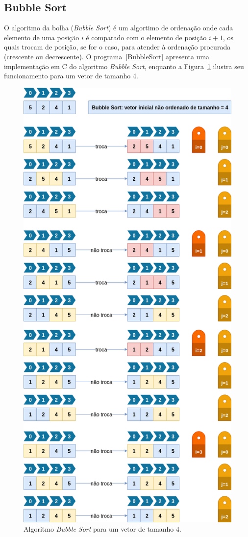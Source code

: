 \documentclass[11pt,fleqn]{book} %
\begin{document}
\subsection*{Bubble Sort}
O algoritmo da bolha (\textit{Bubble Sort}) é um algortimo de ordenação onde cada elemento de uma posição $i$ é comparado com o elemento de posição $i+1$, os quais trocam de posição, se for o caso, para atender à ordenação procurada (crescente ou decrescente).
O  programa~\ref{BubbleSort} apresenta uma implementação em C do algoritmo \textit{Bubble Sort}, enquanto a Figura~\ref{diaBubleSort} ilustra seu funcionamento para um vetor de tamanho 4.
\label{BubbleSort}
\begin{figure}
	\centering
	\includegraphics[width=.7\textwidth]{Pictures/BubbleSort}
	\caption[Bubble Sort]{Algoritmo \textit{Bubble Sort} para um vetor de tamanho 4.}
	\label{diaBubleSort}
\end{figure}
\end{document}

